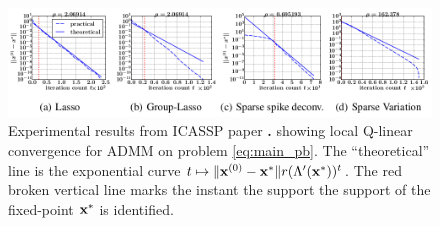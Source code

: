   \begin{figure}[!htbp]
  \includegraphics[width=1\linewidth]{figures/admm.png}
  \caption{{Experimental results from ICASSP paper}   \citep{dohmatob2015local}\textbf{.} showing local Q-linear convergence for ADMM
    on problem \eqref{eq:main_pb}. %
  The ``theoretical'' line is the exponential
  curve $t \mapsto \|\mathbf{x}^{(0)} - \mathbf{x}^*\|r(\Lambda'(\mathbf{x}^*))^t$. The red broken
  vertical line marks the instant the support the support of the fixed-point $\mathbf{x}^*$
  is identified.
}  
\end{figure}









